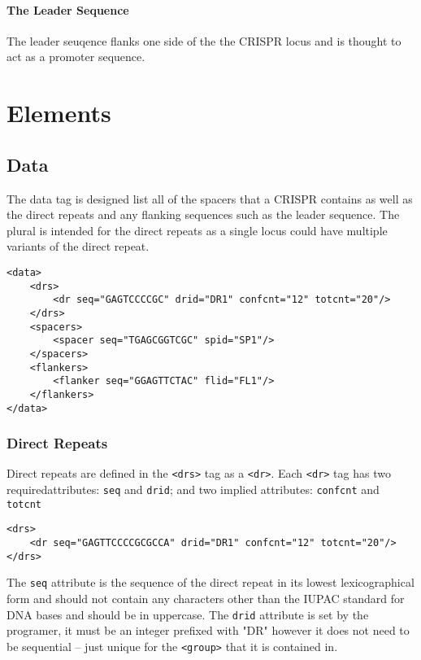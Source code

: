 \documentclass[11pt]{article} %
\begin{document}
\paragraph{The Leader Sequence}
The leader seuqence flanks one side of the the CRISPR locus and is thought to act as a promoter sequence.
\section{Elements}
\subsection{Data}
The data tag is designed list all of the spacers that a CRISPR contains as well as the direct repeats and any flanking sequences such as the leader sequence.  The plural is intended for the direct repeats as a single locus could have multiple variants of the direct repeat.

\begin{lstlisting}[language=XML_new]
<data>
	<drs>
		<dr seq="GAGTCCCCGC" drid="DR1" confcnt="12" totcnt="20"/>
	</drs>
	<spacers>
		<spacer seq="TGAGCGGTCGC" spid="SP1"/>
	</spacers>
	<flankers>
		<flanker seq="GGAGTTCTAC" flid="FL1"/>
	</flankers>
</data>
\end{lstlisting}
\subsubsection{Direct Repeats}
Direct repeats are defined in the \lstinline[language=XML_new]$<drs>$  tag as a \lstinline[language=XML_new]$<dr>$.  Each \lstinline[language=XML_new]$<dr>$  tag has two requiredattributes: \lstinline[language=XML_new]$seq$ and \lstinline[language=XML_new]$drid$; and two implied attributes: \lstinline[language=XML_new]$confcnt$ and \lstinline[language=XML_new]$totcnt$

\begin{lstlisting}[language=XML_new]
<drs>
	<dr seq="GAGTTCCCCGCGCCA" drid="DR1" confcnt="12" totcnt="20"/>
</drs>
\end{lstlisting}

The \lstinline[language=XML_new]$seq$ attribute is the sequence of the direct repeat in its lowest lexicographical form and should not contain any characters other than the IUPAC standard for DNA bases and should be in uppercase.   The \lstinline[language=XML_new]$drid$ attribute is set by the programer, it must be an integer prefixed with "DR" however it does not need to be sequential -- just unique for the \lstinline[language=XML_new]$<group>$ that it is contained in.  
\end{document}
